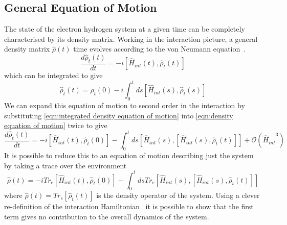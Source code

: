 
\subsection{General Equation of Motion}
The state of the electron hydrogen
system at a given time can be completely
characterised by its density
matrix.
Working in the interaction
picture, a general density matrix
\(\hat{\rho}(t)\) time evolves according
to the von Neumann equation~\cite{TP2_Notes}.
\begin{equation}
    \frac{d\hat{\rho}_t(t)}{dt} =
    -i [\hat{H}_{int}(t), \hat{\rho}_t(t)]
    \label{eqn:density equation of motion}
\end{equation}
which can be integrated to give
\begin{equation}
    \hat{\rho}_t(t) =
    \hat{\rho}_t(0)
    - i \int_0^t ds
        [\hat{H}_{int}(s), \hat{\rho}_t(s)]
    \label{eqn:integrated density equation of motion}
\end{equation}
We can expand this equation of motion
to second order in the interaction
by substituting \cref{eqn:integrated density equation of motion}
into \cref{eqn:density equation of motion}
twice to give
\begin{equation}
    \frac{d\hat{\rho}_t(t)}{dt} =
    -i [\hat{H}_{int}(t), \hat{\rho}_t(0)]
    - \int_0^t ds
        [\hat{H}_{int}(s),
            [\hat{H}_{int}(s), \hat{\rho}_t(t)]]
    +\mathcal{O}({\hat{H}_{int}}^3)
    \label{eqn:second order eqn of motion}
\end{equation}
It is possible to reduce this to
an equation of motion
describing just the system by taking
a trace over the environment~\cite{Manzano_2020}
\begin{equation}
    \hat{\rho}(t) =
    -i Tr_e[\hat{H}_{int}(t), \hat{\rho}_t(0)]
    - \int_0^t ds
    Tr_e[\hat{H}_{int}(s),
    [\hat{H}_{int}(s), \hat{\rho}_t(t)]]
    \label{eqn:density motion before redfield approximation}
\end{equation}
where \(\hat{\rho}(t) = Tr_e[\hat{\rho}_t(t)]\)
is the density operator of the system.
Using a clever re-definition of the interaction
Hamiltonian~\cite{Manzano_2020} it
is possible to show that the first
term gives no contribution to the
overall dynamics of the system.

